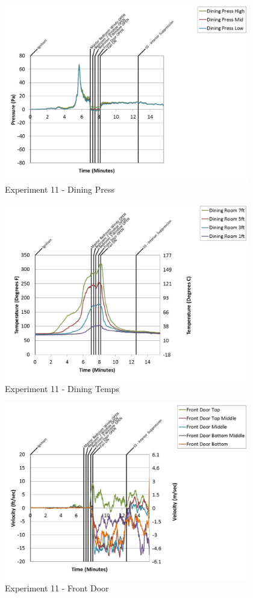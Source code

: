 \documentclass{article}
\begin{document}
\begin{appendices}
	\begin{figure}[h!]
		\centering
		\includegraphics[height=3.05in]{0_Images/Results_Charts/Exp_11_Charts/DiningPress.pdf}
		\caption{Experiment 11 - Dining Press}
	\end{figure}
 
	\clearpage

	\begin{figure}[h!]
		\centering
		\includegraphics[height=3.05in]{0_Images/Results_Charts/Exp_11_Charts/DiningTemps.pdf}
		\caption{Experiment 11 - Dining Temps}
	\end{figure}
 

	\begin{figure}[h!]
		\centering
		\includegraphics[height=3.05in]{0_Images/Results_Charts/Exp_11_Charts/FrontDoor.pdf}
		\caption{Experiment 11 - Front Door}
	\end{figure}
 

\end{appendices}
\end{document}

